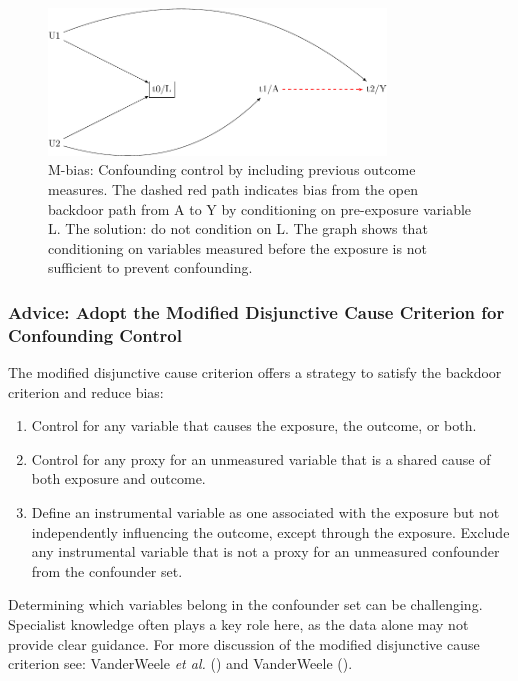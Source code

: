 \documentclass[
  singlecolumn,
  9pt]{article}
\providecommand{\tightlist}{%
  \setlength{\itemsep}{0pt}\setlength{\parskip}{0pt}}\usepackage{longtable,booktabs,array}
\begin{document}
\begin{figure}

{\centering \includegraphics[width=0.8\textwidth,height=\textheight]{causal-dags_files/figure-pdf/fig-m-bias-1.pdf}

}

\caption{\label{fig-m-bias}M-bias: Confounding control by including
previous outcome measures. The dashed red path indicates bias from the
open backdoor path from A to Y by conditioning on pre-exposure variable
L. The solution: do not condition on L. The graph shows that
conditioning on variables measured before the exposure is not sufficient
to prevent confounding.}

\end{figure}

\subsubsection{Advice: Adopt the Modified Disjunctive Cause Criterion
for Confounding
Control}\label{advice-adopt-the-modified-disjunctive-cause-criterion-for-confounding-control-1}

The modified disjunctive cause criterion offers a strategy to satisfy
the backdoor criterion and reduce bias:

\begin{enumerate}
\def\labelenumi{\alph{enumi}.}
\tightlist
\item
  Control for any variable that causes the exposure, the outcome, or
  both.
\item
  Control for any proxy for an unmeasured variable that is a shared
  cause of both exposure and outcome.
\item
  Define an instrumental variable as one associated with the exposure
  but not independently influencing the outcome, except through the
  exposure. Exclude any instrumental variable that is not a proxy for an
  unmeasured confounder from the confounder set.
\end{enumerate}

Determining which variables belong in the confounder set can be
challenging. Specialist knowledge often plays a key role here, as the
data alone may not provide clear guidance. For more discussion of the
modified disjunctive cause criterion see: VanderWeele \emph{et al.}
() and VanderWeele
().
\end{document}
